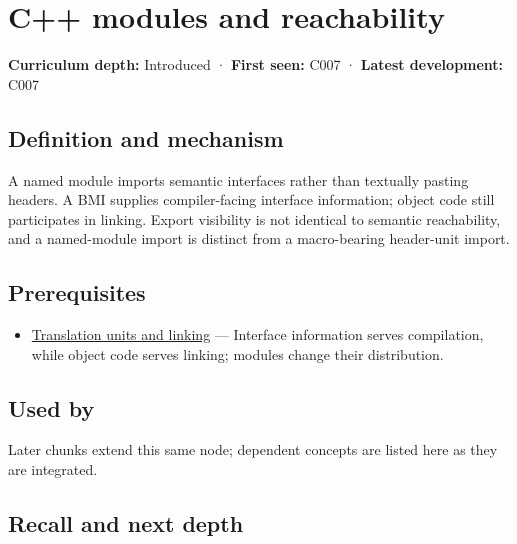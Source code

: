 \hypertarget{appendix-410a611a5b8d}{}\label{referencestart:appendix-410a611a5b8d}
\section{C++ modules and reachability}\label{appendix-410a611a5b8d-c-modules-and-reachability}

\textbf{Curriculum depth:} Introduced · \textbf{First seen:} C007 · \textbf{Latest development:} C007

\begin{allmightroledefinition}

\subsection{Definition and mechanism}\label{appendix-410a611a5b8d-definition-and-mechanism}

A named module imports semantic interfaces rather than textually pasting headers. A BMI supplies compiler-facing interface information; object code still participates in linking. Export visibility is not identical to semantic reachability, and a named-module import is distinct from a macro-bearing header-unit import.

\end{allmightroledefinition}

\subsection{Prerequisites}\label{appendix-410a611a5b8d-prerequisites}

\begin{itemize}
\tightlist
\item
  \hyperref[appendix-806686359e1b]{Translation units and linking} --- Interface information serves compilation, while object code serves linking; modules change their distribution.
\end{itemize}

\subsection{Used by}\label{appendix-410a611a5b8d-used-by}

Later chunks extend this same node; dependent concepts are listed here as they are integrated.

\subsection{Recall and next depth}\label{appendix-410a611a5b8d-recall-and-next-depth}

